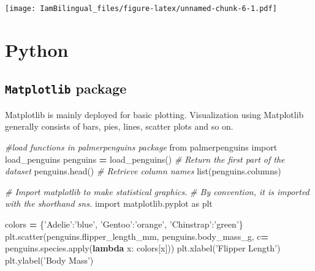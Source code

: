 \documentclass[]{book}
\newenvironment{Shaded}{\begin{snugshade}}{\end{snugshade}}
\newcommand{\BuiltInTok}[1]{#1}
\newcommand{\CommentTok}[1]{\textcolor[rgb]{0.56,0.35,0.01}{\textit{#1}}}
\newcommand{\ImportTok}[1]{#1}
\newcommand{\KeywordTok}[1]{\textcolor[rgb]{0.13,0.29,0.53}{\textbf{#1}}}
\newcommand{\NormalTok}[1]{#1}
\newcommand{\OperatorTok}[1]{\textcolor[rgb]{0.81,0.36,0.00}{\textbf{#1}}}
\newcommand{\StringTok}[1]{\textcolor[rgb]{0.31,0.60,0.02}{#1}}
\begin{document}
\texttt{[image: IamBilingual\_files/figure-latex/unnamed-chunk-6-1.pdf]}

\hypertarget{python-4}{%
\section{Python}\label{python-4}}

\hypertarget{matplotlib-package}{%
\subsection{\texorpdfstring{\texttt{Matplotlib} package}{Matplotlib package}}\label{matplotlib-package}}

Matplotlib is mainly deployed for basic plotting. Visualization using Matplotlib generally consists of bars, pies, lines, scatter plots and so on.

\begin{Shaded}
\begin{Highlighting}[]
\CommentTok{#load functions in palmerpenguins package}
\ImportTok{from}\NormalTok{ palmerpenguins }\ImportTok{import}\NormalTok{ load_penguins}
\NormalTok{penguins }\OperatorTok{=}\NormalTok{ load_penguins()}
\CommentTok{# Return the first part of the dataset}
\NormalTok{penguins.head()}
\CommentTok{# Retrieve column names}
\BuiltInTok{list}\NormalTok{(penguins.columns)}

\CommentTok{# Import matplotlib to make statistical graphics. }
\CommentTok{# By convention, it is imported with the shorthand sns.}
\ImportTok{import}\NormalTok{ matplotlib.pyplot }\ImportTok{as}\NormalTok{ plt}

\NormalTok{colors }\OperatorTok{=}\NormalTok{ \{}\StringTok{'Adelie'}\NormalTok{:}\StringTok{'blue'}\NormalTok{, }\StringTok{'Gentoo'}\NormalTok{:}\StringTok{'orange'}\NormalTok{, }\StringTok{'Chinstrap'}\NormalTok{:}\StringTok{'green'}\NormalTok{\}}
\NormalTok{plt.scatter(penguins.flipper_length_mm, penguins.body_mass_g, c}\OperatorTok{=}\NormalTok{ penguins.species.}\BuiltInTok{apply}\NormalTok{(}\KeywordTok{lambda}\NormalTok{ x: colors[x]))}
\NormalTok{plt.xlabel(}\StringTok{'Flipper Length'}\NormalTok{)}
\NormalTok{plt.ylabel(}\StringTok{'Body Mass'}\NormalTok{)}
\end{Highlighting}
\end{Shaded}
\end{document}
